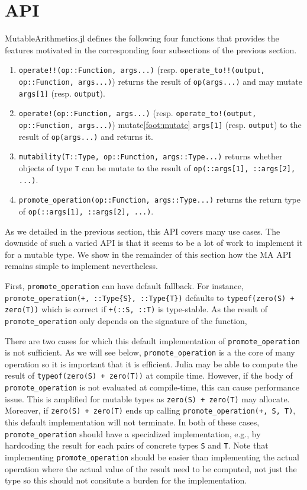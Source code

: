 \documentclass{juliacon}
\begin{document}
\section{API}

MutableArithmetics.jl defines the following four functions that provides the features motivated in the corresponding four subsections of the previous section.
\begin{enumerate}
  \item \lstinline|operate!!(op::Function, args...)| (resp. \lstinline|operate_to!!(output, op::Function, args...)|) returns the result of \lstinline|op(args...)| and may mutate \lstinline|args[1]| (resp. \lstinline|output|).
  \item \lstinline|operate!(op::Function, args...)| (resp. \lstinline|operate_to!(output, op::Function, args...)|) mutate\cref{foot:mutate} \lstinline|args[1]| (resp. \lstinline|output|) to the result of \lstinline|op(args...)| and returns it.
  \item \lstinline|mutability(T::Type, op::Function, args::Type...)| returns whether objects of type \lstinline|T| can be mutate to the result of \lstinline|op(::args[1], ::args[2], ...)|.
  \item \lstinline|promote_operation(op::Function, args::Type...)| returns the return type of \lstinline|op(::args[1], ::args[2], ...)|.
\end{enumerate}

As we detailed in the previous section, this API covers many use cases.
The downside of such a varied API is that it seems to be a lot of work to implement it for a mutable type.
We show in the remainder of this section how the MA API remains simple to implement nevertheless.

First, \lstinline|promote_operation| can have default fallback.
For instance, \lstinline|promote_operation(+, ::Type{S}, ::Type{T})|
defaults to \lstinline|typeof(zero(S) + zero(T))| which is correct if \lstinline|+(::S, ::T)| is type-stable.
As the result of \lstinline|promote_operation| only depends on the signature of the function,

There are two cases for which this default implementation of \lstinline|promote_operation| is not sufficient.
As we will see below, \lstinline|promote_operation| is a the core of many operation so it is important that it is efficient.
Julia may be able to compute the result of \lstinline|typeof(zero(S) + zero(T))| at compile time.
However, if the body of \lstinline|promote_operation| is not evaluated at compile-time, this can cause performance issue.
This is amplified for mutable types as \lstinline|zero(S) + zero(T)| may allocate.
Moreover, if \lstinline|zero(S) + zero(T)| ends up calling \lstinline|promote_operation(+, S, T)|, this default implementation will not terminate.
In both of these cases, \lstinline|promote_operation| should have a specialized implementation, e.g., by hardcoding the result for each pairs of concrete types \lstinline|S| and \lstinline|T|.
Note that implementing \lstinline|promote_operation| should be easier than implementing the actual operation where the actual value of the result need to be computed, not just the type so this should not consitute a burden for the implementation.
\end{document}
